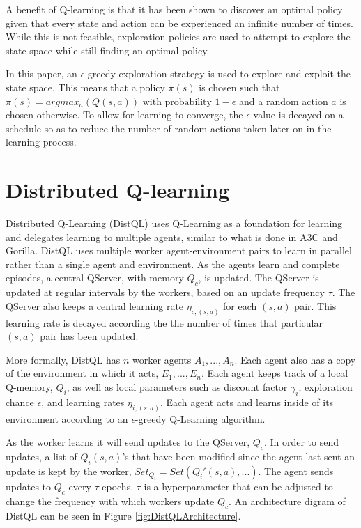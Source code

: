 \documentclass[jair,twoside,11pt,theapa]{article}
\begin{document}
A benefit of Q-learning is that it has been shown to discover an optimal policy \cite{qlearning} given that every state and action can be experienced an infinite number of times. While this is not feasible, exploration policies are used to attempt to explore the state space while still finding an optimal policy. 

In this paper, an $\epsilon$-greedy exploration strategy is used to explore and exploit the state space. This means that a policy $\pi(s)$ is chosen such that $\pi(s)=argmax_a(Q(s,a)) \text{ with probability } 1-\epsilon$ and a random action $a$ is chosen otherwise. To allow for learning to converge, the $\epsilon$ value is decayed on a schedule so as to reduce the number of random actions taken later on in the learning process. 


\section{Distributed Q-learning} 
\label{algorithm}
Distributed Q-Learning (DistQL) uses Q-Learning as a foundation for learning and delegates learning to multiple agents, similar to what is done in A3C and Gorilla. DistQL uses multiple worker agent-environment pairs to learn in parallel rather than a single agent and environment. As the agents learn and complete episodes, a central QServer, with memory $Q_c$, is updated. The QServer is updated at regular intervals by the workers, based on an update frequency $\tau$. The QServer also keeps a central learning rate $\eta_{c,(s,a)}$ for each $(s,a)$ pair. This learning rate is decayed according the the number of times that particular $(s,a)$ pair has been updated. 

More formally, DistQL has $n$ worker agents $A_1,..., A_n$. Each agent also has a copy of the environment in which it acts, $E_1,...,E_n$. Each agent keeps track of a local Q-memory, $Q_i$, as well as local parameters such as discount factor $\gamma_i$, exploration chance $\epsilon$, and learning rates $\eta_{i,(s,a)}$. Each agent acts and learns inside of its environment according to an $\epsilon$-greedy Q-Learning algorithm.

As the worker learns it will send updates to the QServer, $Q_c$. In order to send updates, a list of $Q_i(s,a)$'s that have been modified since the agent last sent an update is kept by the worker, $Set_{Q_i} = Set(Q_i'(s,a),...)$. The agent sends updates to $Q_c$ every $\tau$ epochs. $\tau$ is a hyperparameter that can be adjusted to change the frequency with which workers update $Q_c$. An architecture digram of DistQL can be seen in Figure \ref{fig:DistQLArchitecture}. 
\end{document}
